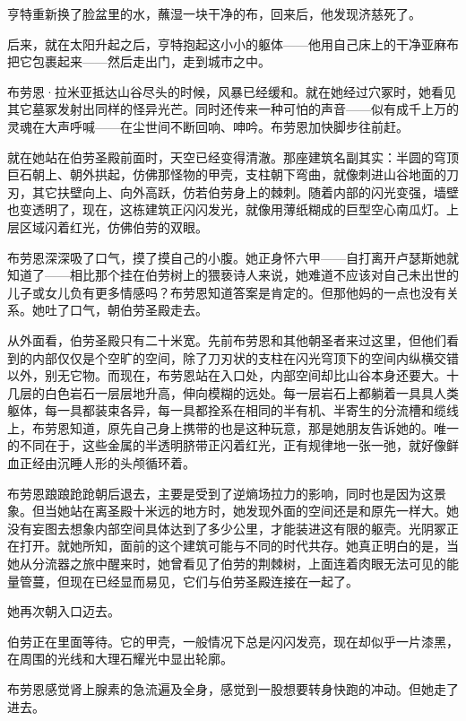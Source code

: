 \documentclass[AutoFakeBold=true]{book}
\begin{document}
亨特重新换了脸盆里的水，蘸湿一块干净的布，回来后，他发现济慈死了。

后来，就在太阳升起之后，亨特抱起这小小的躯体——他用自己床上的干净亚麻布把它包裹起来——然后走出门，走到城市之中。

\vspace*{1em}

布劳恩·拉米亚抵达山谷尽头的时候，风暴已经缓和。就在她经过穴冢时，她看见其它墓冢发射出同样的怪异光芒。同时还传来一种可怕的声音——似有成千上万的灵魂在大声呼喊——在尘世间不断回响、呻吟。布劳恩加快脚步往前赶。

就在她站在伯劳圣殿前面时，天空已经变得清澈。那座建筑名副其实：半圆的穹顶巨石朝上、朝外拱起，仿佛那怪物的甲壳，支柱朝下弯曲，就像刺进山谷地面的刀刃，其它扶壁向上、向外高跃，仿若伯劳身上的棘刺。随着内部的闪光变强，墙壁也变透明了，现在，这栋建筑正闪闪发光，就像用薄纸糊成的巨型空心南瓜灯。上层区域闪着红光，仿佛伯劳的双眼。

布劳恩深深吸了口气，摸了摸自己的小腹。她正身怀六甲——自打离开卢瑟斯她就知道了——相比那个挂在伯劳树上的猥亵诗人来说，她难道不应该对自己未出世的儿子或女儿负有更多情感吗？布劳恩知道答案是肯定的。但那他妈的一点也没有关系。她吐了口气，朝伯劳圣殿走去。

从外面看，伯劳圣殿只有二十米宽。先前布劳恩和其他朝圣者来过这里，但他们看到的内部仅仅是个空旷的空间，除了刀刃状的支柱在闪光穹顶下的空间内纵横交错以外，别无它物。而现在，布劳恩站在入口处，内部空间却比山谷本身还要大。十几层的白色岩石一层层地升高，伸向模糊的远处。每一层岩石上都躺着一具具人类躯体，每一具都装束各异，每一具都拴系在相同的半有机、半寄生的分流槽和缆线上，布劳恩知道，原先自己身上携带的也是这种玩意，那是她朋友告诉她的。唯一的不同在于，这些金属的半透明脐带正闪着红光，正有规律地一张一弛，就好像鲜血正经由沉睡人形的头颅循环着。

布劳恩踉踉跄跄朝后退去，主要是受到了逆熵场拉力的影响，同时也是因为这景象。但当她站在离圣殿十米远的地方时，她发现外面的空间还是和原先一样大。她没有妄图去想象内部空间具体达到了多少公里，才能装进这有限的躯壳。光阴冢正在打开。就她所知，面前的这个建筑可能与不同的时代共存。她真正明白的是，当她从分流器之旅中醒来时，她曾看见了伯劳的荆棘树，上面连着肉眼无法可见的能量管蔓，但现在已经显而易见，它们与伯劳圣殿连接在一起了。

她再次朝入口迈去。

伯劳正在里面等待。它的甲壳，一般情况下总是闪闪发亮，现在却似乎一片漆黑，在周围的光线和大理石耀光中显出轮廓。

布劳恩感觉肾上腺素的急流遍及全身，感觉到一股想要转身快跑的冲动。但她走了进去。
\end{document}
